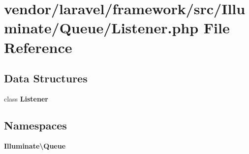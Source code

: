 \section{vendor/laravel/framework/src/\+Illuminate/\+Queue/\+Listener.php File Reference}
\label{_listener_8php}
\subsection*{Data Structures}
\begin{DoxyCompactItemize}
\item 
class {\bf Listener}
\end{DoxyCompactItemize}
\subsection*{Namespaces}
\begin{DoxyCompactItemize}
\item 
 {\bf Illuminate\textbackslash{}\+Queue}
\end{DoxyCompactItemize}
